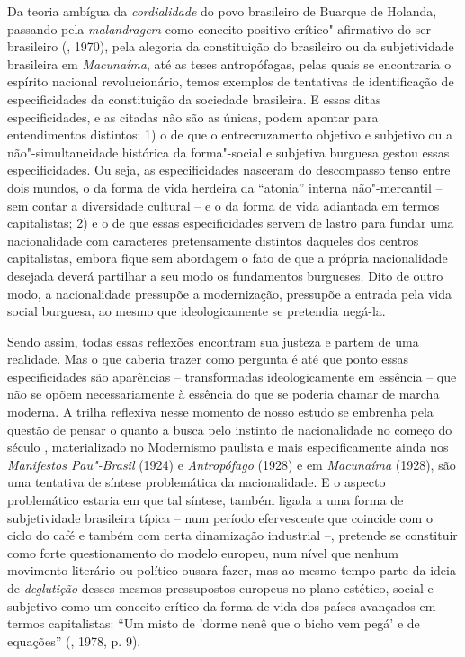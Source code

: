 Da teoria ambígua da \emph{cordialidade} do povo brasileiro de Buarque
de Holanda, passando pela \emph{malandragem} como conceito positivo
crítico"-afirmativo do ser brasileiro (, 1970), pela alegoria da
constituição do brasileiro ou da subjetividade brasileira em
\emph{Macunaíma}, até as teses antropófagas, pelas quais se encontraria
o espírito nacional revolucionário, temos exemplos de tentativas de
identificação de especificidades da constituição da sociedade
brasileira. E essas ditas especificidades, e as citadas não são as
únicas, podem apontar para entendimentos distintos: 1) o de que o
entrecruzamento objetivo e subjetivo ou a não"-simultaneidade histórica
da forma"-social e subjetiva burguesa gestou essas especificidades. Ou
seja, as especificidades nasceram do descompasso tenso entre dois
mundos, o da forma de vida herdeira da ``atonia'' interna não"-mercantil
-- sem contar a diversidade cultural -- e o da forma de vida adiantada
em termos capitalistas; 2) e o de que essas especificidades servem de
lastro para fundar uma nacionalidade com caracteres pretensamente
distintos daqueles dos centros capitalistas, embora fique sem abordagem
o fato de que a própria nacionalidade desejada deverá partilhar a seu
modo os fundamentos burgueses. Dito de outro modo, a nacionalidade
pressupõe a modernização, pressupõe a entrada pela vida social burguesa,
ao mesmo que ideologicamente se pretendia negá-la.

Sendo assim, todas essas reflexões encontram sua justeza e partem de uma
realidade. Mas o que caberia trazer como pergunta é até que ponto essas
especificidades são aparências -- transformadas ideologicamente em
essência -- que não se opõem necessariamente à essência do que se
poderia chamar de marcha moderna. A trilha reflexiva nesse momento de
nosso estudo se embrenha pela questão de pensar o quanto a busca pelo
instinto de nacionalidade no começo do século , materializado no
Modernismo paulista e mais especificamente ainda nos \emph{Manifestos
Pau"-Brasil} (1924) e \emph{Antropófago} (1928) e em \emph{Macunaíma}
(1928), são uma tentativa de síntese problemática da nacionalidade. E o
aspecto problemático estaria em que tal síntese, também ligada a uma
forma de subjetividade brasileira típica -- num período efervescente que
coincide com o ciclo do café e também com certa dinamização industrial
--, pretende se constituir como forte questionamento do modelo europeu,
num nível que nenhum movimento literário ou político ousara fazer, mas
ao mesmo tempo parte da ideia de \emph{deglutição} desses mesmos
pressupostos europeus no plano estético, social e subjetivo como um
conceito crítico da forma de vida dos países avançados em termos
capitalistas: ``Um misto de 'dorme nenê que o bicho vem pegá' e de
equações'' (, 1978, p. 9).

